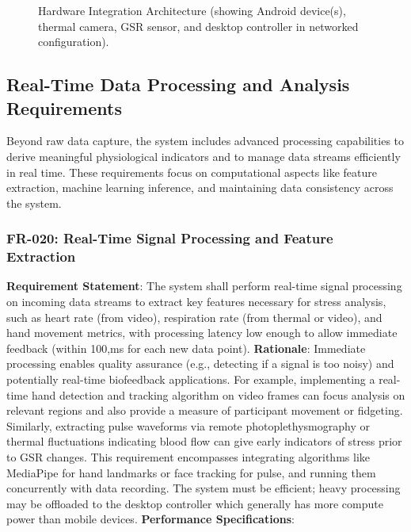 \documentclass[11pt,a4paper]{report}
\begin{document}
\begin{figure}[h]
\centering
\fbox{\rule{0pt}{0.25\textheight}\rule{0.9\textwidth}{0pt}}
\caption{Hardware Integration Architecture (showing Android device(s), thermal camera, GSR sensor, and desktop controller in networked configuration).}
\label{fig:hardware_arch}
\end{figure} \subsection{Real-Time Data Processing and Analysis Requirements}
Beyond raw data capture, the system includes advanced processing capabilities to derive meaningful physiological indicators and to manage data streams efficiently in real time. These requirements focus on computational aspects like feature extraction, machine learning inference, and maintaining data consistency across the system. \subsubsection*{FR-020: Real-Time Signal Processing and Feature Extraction}
\textbf{Requirement Statement}: The system shall perform real-time signal processing on incoming data streams to extract key features necessary for stress analysis, such as heart rate (from video), respiration rate (from thermal or video), and hand movement metrics, with processing latency low enough to allow immediate feedback (within 100,ms for each new data point). \textbf{Rationale}: Immediate processing enables quality assurance (e.g., detecting if a signal is too noisy) and potentially real-time biofeedback applications. For example, implementing a real-time hand detection and tracking algorithm on video frames can focus analysis on relevant regions and also provide a measure of participant movement or fidgeting. Similarly, extracting pulse waveforms via remote photoplethysmography or thermal fluctuations indicating blood flow can give early indicators of stress prior to GSR changes. This requirement encompasses integrating algorithms like MediaPipe for hand landmarks or face tracking for pulse, and running them concurrently with data recording. The system must be efficient; heavy processing may be offloaded to the desktop controller which generally has more compute power than mobile devices. \textbf{Performance Specifications}:
\end{document}
